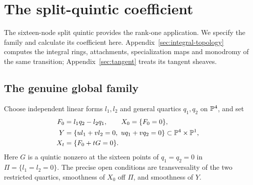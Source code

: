 \section{The split-quintic coefficient}\label{sec:quintic}

The sixteen-node split quintic provides the rank-one application. We specify
the family and calculate its coefficient here. Appendix~\ref{sec:integral-topology}
computes the integral rings, attachments, specialization maps and monodromy
of the same transition; Appendix~\ref{sec:tangent} treats its tangent sheaves.

\subsection{The genuine global family}
Choose independent linear forms $l_1,l_2$ and general quartics $q_1,q_2$
on $\mathbb P^4$, and set
\begin{equation}\label{eq:split-equations}
 \begin{split}
 F_0&=l_1q_2-l_2q_1,\qquad X_0=\{F_0=0\},\\
 Y&=\{ul_1+vl_2=0,\ uq_1+vq_2=0\}
       \subset\mathbb P^4\times\mathbb P^1,\\
 X_t&=\{F_0+tG=0\}.
 \end{split}
\end{equation}
Here $G$ is a quintic nonzero at the sixteen points of
$q_1=q_2=0$ in $\Pi=\{l_1=l_2=0\}$. The precise open conditions
are transversality of the two restricted quartics, smoothness of $X_0$
off $\Pi$, and smoothness of $Y$.


